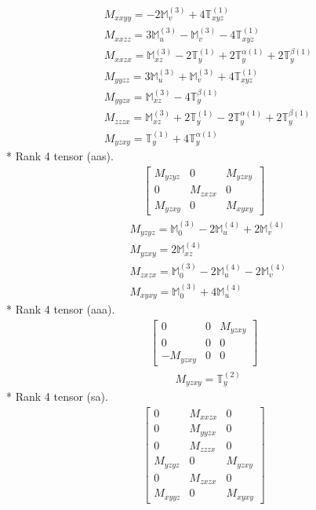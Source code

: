 \documentclass[fleqn,8pt,landscape]{jsarticle}
\begin{document}
\begin{align*}
& M_{xxyy} = - 2 \mathbb{M}_{v}^{(3)} + 4 \mathbb{T}_{xyz}^{(1)} \\
& M_{xxzz} = 3 \mathbb{M}_{u}^{(3)} - \mathbb{M}_{v}^{(3)} - 4 \mathbb{T}_{xyz}^{(1)} \\
& M_{xxzx} = \mathbb{M}_{xz}^{(3)} - 2 \mathbb{T}_{y}^{(1)} + 2 \mathbb{T}_{y}^{\alpha(1)} + 2 \mathbb{T}_{y}^{\beta(1)} \\
& M_{yyzz} = 3 \mathbb{M}_{u}^{(3)} + \mathbb{M}_{v}^{(3)} + 4 \mathbb{T}_{xyz}^{(1)} \\
& M_{yyzx} = \mathbb{M}_{xz}^{(3)} - 4 \mathbb{T}_{y}^{\beta(1)} \\
& M_{zzzx} = \mathbb{M}_{xz}^{(3)} + 2 \mathbb{T}_{y}^{(1)} - 2 \mathbb{T}_{y}^{\alpha(1)} + 2 \mathbb{T}_{y}^{\beta(1)} \\
& M_{yzxy} = \mathbb{T}_{y}^{(1)} + 4 \mathbb{T}_{y}^{\alpha(1)}
\end{align*}
* Rank 4 tensor (aas).
\begin{align*}
\begin{bmatrix} M_{yzyz} & 0 & M_{yzxy} \\ 0 & M_{zxzx} & 0 \\ M_{yzxy} & 0 & M_{xyxy} \end{bmatrix}
\end{align*}
\begin{align*}
& M_{yzyz} = \mathbb{M}_{0}^{(3)} - 2 \mathbb{M}_{u}^{(4)} + 2 \mathbb{M}_{v}^{(4)} \\
& M_{yzxy} = 2 \mathbb{M}_{xz}^{(4)} \\
& M_{zxzx} = \mathbb{M}_{0}^{(3)} - 2 \mathbb{M}_{u}^{(4)} - 2 \mathbb{M}_{v}^{(4)} \\
& M_{xyxy} = \mathbb{M}_{0}^{(3)} + 4 \mathbb{M}_{u}^{(4)}
\end{align*}
* Rank 4 tensor (aaa).
\begin{align*}
\begin{bmatrix} 0 & 0 & M_{yzxy} \\ 0 & 0 & 0 \\ - M_{yzxy} & 0 & 0 \end{bmatrix}
\end{align*}
\begin{align*}
& M_{yzxy} = \mathbb{T}_{y}^{(2)}
\end{align*}
* Rank 4 tensor (sa).
\begin{align*}
\begin{bmatrix} 0 & M_{xxzx} & 0 \\ 0 & M_{yyzx} & 0 \\ 0 & M_{zzzx} & 0 \\ M_{yzyz} & 0 & M_{yzxy} \\ 0 & M_{zxzx} & 0 \\ M_{xyyz} & 0 & M_{xyxy} \end{bmatrix}
\end{align*}
\end{document}
